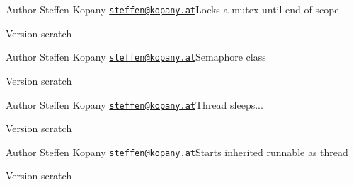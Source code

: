 \begin{DoxyAuthor}{Author}
Steffen Kopany \href{mailto:steffen@kopany.at}{\tt steffen@kopany.\-at}Locks a mutex until end of scope 
\end{DoxyAuthor}
\begin{DoxyVersion}{Version}
scratch
\end{DoxyVersion}
\begin{DoxyAuthor}{Author}
Steffen Kopany \href{mailto:steffen@kopany.at}{\tt steffen@kopany.\-at}Semaphore class 
\end{DoxyAuthor}
\begin{DoxyVersion}{Version}
scratch
\end{DoxyVersion}
\begin{DoxyAuthor}{Author}
Steffen Kopany \href{mailto:steffen@kopany.at}{\tt steffen@kopany.\-at}Thread sleeps... 
\end{DoxyAuthor}
\begin{DoxyVersion}{Version}
scratch
\end{DoxyVersion}
\begin{DoxyAuthor}{Author}
Steffen Kopany \href{mailto:steffen@kopany.at}{\tt steffen@kopany.\-at}Starts inherited runnable as thread 
\end{DoxyAuthor}
\begin{DoxyVersion}{Version}
scratch 
\end{DoxyVersion}


